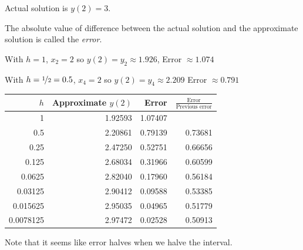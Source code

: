 \documentclass[10pt,aspectratio=169]{beamer}
\begin{document}
\begin{frame}
Actual solution is $y(2) = 3$.

\medskip
\pause

The absolute value of difference between the actual solution and the approximate solution is
called the \emph{error}.

\medskip
\pause

With $h=1$, $x_2=2$ so $y(2) = y_2 \approx 1.926$, 
\quad
\pause
Error ${}\approx 1.074$

\medskip
\pause

With $h=\nicefrac{1}{2} = 0.5$, $x_4=2$ so $y(2) = y_4 \approx 2.209$
\quad
\pause
Error ${}\approx 0.791$

\medskip
\pause

\hspace*{\fill}
\begin{tabular}{@{}rrrr@{}}
\toprule
$h$ & Approximate $y(2)$ & Error & $\frac{\text{Error}}{\text{Previous error}}$ \\
\midrule
1        & 1.92593 & 1.07407 & \\
0.5      & 2.20861 & 0.79139 & 0.73681 \\
0.25     & 2.47250 & 0.52751 & 0.66656 \\
0.125    & 2.68034 & 0.31966 & 0.60599 \\
0.0625   & 2.82040 & 0.17960 & 0.56184 \\
0.03125  & 2.90412 & 0.09588 & 0.53385 \\
0.015625 & 2.95035 & 0.04965 & 0.51779 \\
0.0078125& 2.97472 & 0.02528 & 0.50913 \\
\bottomrule
\end{tabular}
\hspace*{\fill}

\medskip
\pause

Note that it seems like error halves when we halve the interval.

\end{frame}
\end{document}
